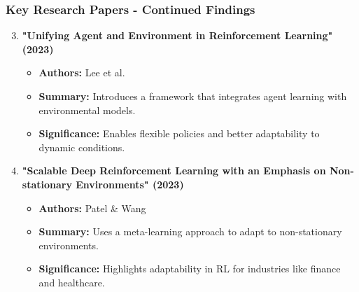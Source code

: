 \documentclass[aspectratio=169]{beamer}
\begin{document}
\begin{frame}[fragile]
    \frametitle{Key Research Papers - Continued Findings}
    \begin{enumerate}
        \setcounter{enumi}{2} %
        \item \textbf{"Unifying Agent and Environment in Reinforcement Learning" (2023)}
            \begin{itemize}
                \item \textbf{Authors:} Lee et al.
                \item \textbf{Summary:} Introduces a framework that integrates agent learning with environmental models.
                \item \textbf{Significance:} Enables flexible policies and better adaptability to dynamic conditions.
            \end{itemize}
        \item \textbf{"Scalable Deep Reinforcement Learning with an Emphasis on Non-stationary Environments" (2023)}
            \begin{itemize}
                \item \textbf{Authors:} Patel \& Wang
                \item \textbf{Summary:} Uses a meta-learning approach to adapt to non-stationary environments.
                \item \textbf{Significance:} Highlights adaptability in RL for industries like finance and healthcare.
            \end{itemize}
    \end{enumerate}
\end{frame}
\end{document}
